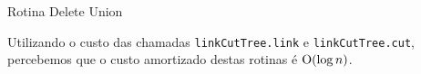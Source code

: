 \begin{algorithm}[h!]
    \caption{Rotina Delete Union}\label{uf:delete-union}
    \begin{algorithmic}[1]
        \EndFunction
    \end{algorithmic}
\end{algorithm}

Utilizando o custo das chamadas \texttt{linkCutTree.link} e \texttt{linkCutTree.cut}, percebemos que o custo amortizado destas rotinas é $\mathrm{O}(\log n)$.
